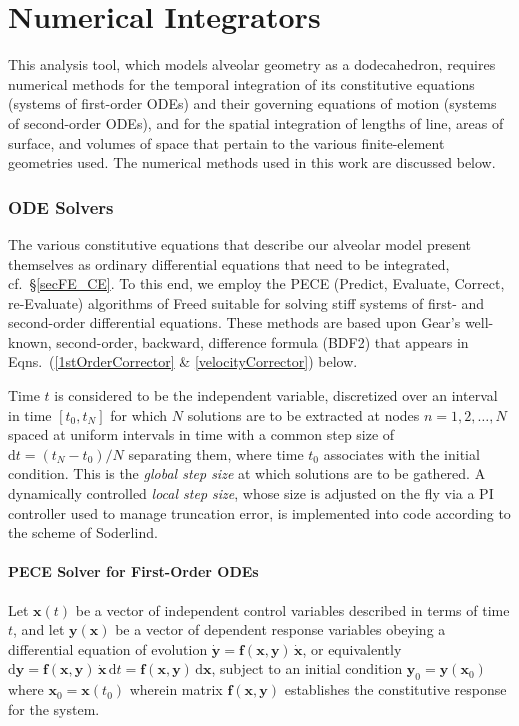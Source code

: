 \part{Numerical Integrators}
\label{partNumericalMethods}

This analysis tool, which models alveolar geometry as a dodecahedron, requires numerical methods for the temporal integration of its constitutive equations (systems of first-order ODEs) and their governing equations of motion (systems of second-order ODEs), and for the spatial integration of lengths of line, areas of surface, and volumes of space that pertain to the various finite-element geometries used.  The numerical methods used in this work are discussed below.

\section{ODE Solvers}

The various constitutive equations that describe our alveolar model present themselves as ordinary differential equations that need to be integrated, cf.\ \S\ref{secFE_CE}.  To this end, we employ the PECE (Predict, Evaluate, Correct, re-Evaluate) algorithms of Freed \cite{Freed17a} suitable for solving stiff systems of first- and second-order differential equations.  These methods are based upon Gear's well-known, second-order, backward, difference formula (BDF2) that appears in Eqns.~(\ref{1stOrderCorrector} \& \ref{velocityCorrector}) below.

Time $t$ is considered to be the independent variable, discretized over an interval in time $[t_0, t_N]$ for which $N$ solutions are to be extracted at nodes $n=1, 2, \ldots, N$ spaced at uniform intervals in time with a common step size of $\mathrm{d}t = (t_N - t_0)/N$ separating them, where time $t_0$ associates with the initial condition.  This is the \textit{global step size\/} at which solutions are to be gathered.  A dynamically controlled \textit{local step size}, whose size is adjusted on the fly via a PI controller used to manage truncation error, is implemented into code according to the scheme of Soderlind. \cite{Soderlind02} 

\subsection{PECE Solver for First-Order ODEs}
\label{sec:1stOrderPECE}

Let $\mathbf{x}(t)$ be a vector of independent control variables described in terms of time $t$, and let $\mathbf{y} (\mathbf{x})$ be a vector of dependent response variables obeying a differential equation of evolution $\dot{\mathbf{y}} = \mathbf{f} (\mathbf{x}, \mathbf{y}) \, \dot{\mathbf{x}}$, or equivalently $\mathrm{d} \mathbf{y} = \mathbf{f} (\mathbf{x}, \mathbf{y}) \, \dot{\mathbf{x}} \, \mathrm{d} t = \mathbf{f} (\mathbf{x}, \mathbf{y}) \, \mathrm{d}\mathbf{x}$, subject to an initial condition $\mathbf{y}_0 = \mathbf{y}(\mathbf{x}_0)$ where $\mathbf{x}_0 = \mathbf{x} (t_0)$ wherein matrix $\mathbf{f} (\mathbf{x}, \mathbf{y})$ establishes the constitutive response for the system.

